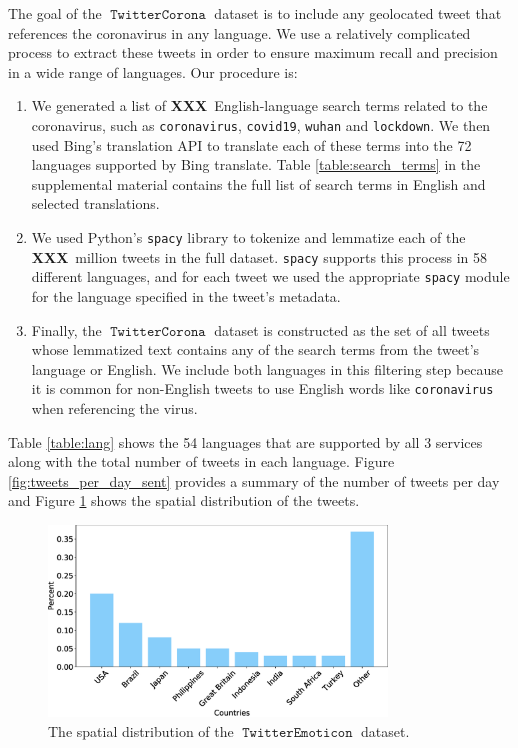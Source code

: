 \documentclass[11pt]{article}
\newcommand{\XXX}{\textbf{XXX}~}
\DeclareMathOperator{\emoticon}{\texttt{TwitterEmoticon}}
\DeclareMathOperator{\corona}{\texttt{TwitterCorona}}
\begin{document}
The goal of the $\corona$ dataset is to include any geolocated tweet that references the coronavirus in any language.
We use a relatively complicated process to extract these tweets in order to ensure maximum recall and precision in a wide range of languages.
Our procedure is:
\begin{enumerate}
\item
We generated a list of \XXX English-language search terms related to the coronavirus,
such as \texttt{coronavirus}, \texttt{covid19}, \texttt{wuhan} and \texttt{lockdown}.
We then used Bing's translation API to translate each of these terms into the 72 languages supported by Bing translate.
Table \ref{table:search_terms} in the supplemental material contains the full list of search terms in English and selected translations.
\item
We used Python's \texttt{spacy} library \citep{spacy2} to tokenize and lemmatize each of the \XXX million tweets in the full dataset.
\texttt{spacy} supports this process in 58 different languages,
and for each tweet we used the appropriate \texttt{spacy} module for the language specified in the tweet's metadata.
\item
Finally, the $\corona$ dataset is constructed as the set of all tweets whose lemmatized text contains any of the search terms from the tweet's language or English.
We include both languages in this filtering step because it is common for non-English tweets to use English words like \texttt{coronavirus} when referencing the virus.
\end{enumerate}
Table \ref{table:lang} shows the 54 languages that are supported by all 3 services along with the total number of tweets in each language.
Figure \ref{fig:tweets_per_day_sent} provides a summary of the number of tweets per day and Figure \ref{fig:corona:spatial} shows the spatial distribution of the tweets.


\begin{figure}
    \centering
    \includegraphics[height=2in]{images/dis_country.eps}
    \caption{The spatial distribution of the $\emoticon$ dataset.}
    \label{fig:corona:spatial}
\end{figure}
\end{document}
